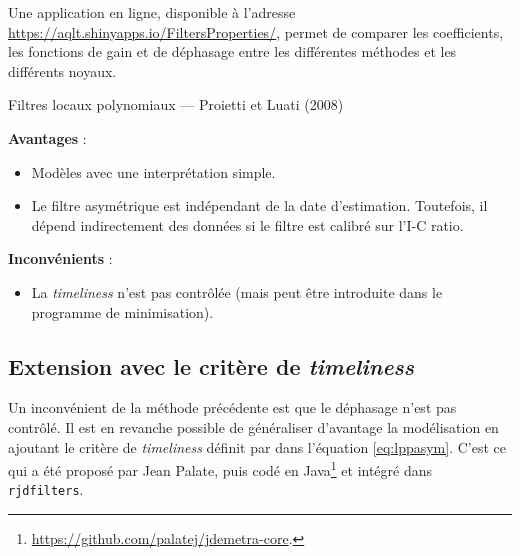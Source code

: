 \documentclass[
  12pt,
  a4paper,french]{article}
\providecommand{\tightlist}{%
  \setlength{\itemsep}{0pt}\setlength{\parskip}{0pt}}
\newcommand\1{\mathds{1}}
\begin{document}
Une application en ligne, disponible à l'adresse \url{https://aqlt.shinyapps.io/FiltersProperties/}, permet de comparer les coefficients, les fonctions de gain et de déphasage entre les différentes méthodes et les différents noyaux.

\begin{summary_box}{Filtres locaux polynomiaux --- Proietti et Luati (2008)}

\textbf{Avantages} :

\begin{itemize}
\item
  Modèles avec une interprétation simple.
\item
  Le filtre asymétrique est indépendant de la date d'estimation.
  Toutefois, il dépend indirectement des données si le filtre est calibré sur l'I-C ratio.
\end{itemize}

\textbf{Inconvénients} :

\begin{itemize}
\tightlist
\item
  La \emph{timeliness} n'est pas contrôlée (mais peut être introduite dans le programme de minimisation).
\end{itemize}

\end{summary_box}

\hypertarget{subsec-lptimeliness}{%
\subsection{\texorpdfstring{Extension avec le critère de \emph{timeliness}}{Extension avec le critère de timeliness}}\label{subsec-lptimeliness}}

Un inconvénient de la méthode précédente est que le déphasage n'est pas contrôlé.
Il est en revanche possible de généraliser d'avantage la modélisation en ajoutant le critère de \emph{timeliness} définit par \textcite{ch15HBSA} dans l'équation \eqref{eq:lppasym}.
C'est ce qui a été proposé par Jean Palate, puis codé en Java\footnote{\url{https://github.com/palatej/jdemetra-core}.} et intégré dans \texttt{rjdfilters}.
\end{document}
